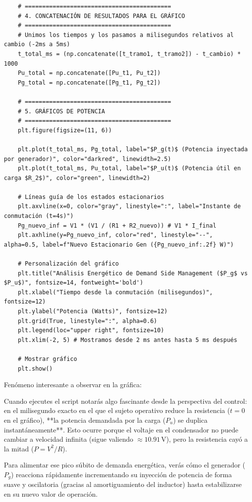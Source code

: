 \documentclass[11pt, a4paper]{article}
\theoremstyle{definition}
\theoremstyle{plain}
\theoremstyle{plain}
\theoremstyle{remark}
\theoremstyle{remark}
\theoremstyle{remark}
\begin{document}
\begin{verbatim}
	# ==========================================
	# 4. CONCATENACIÓN DE RESULTADOS PARA EL GRÁFICO
	# ==========================================
	# Unimos los tiempos y los pasamos a milisegundos relativos al cambio (-2ms a 5ms)
	t_total_ms = (np.concatenate([t_tramo1, t_tramo2]) - t_cambio) * 1000
	Pu_total = np.concatenate([Pu_t1, Pu_t2])
	Pg_total = np.concatenate([Pg_t1, Pg_t2])
	
	# ==========================================
	# 5. GRÁFICOS DE POTENCIA
	# ==========================================
	plt.figure(figsize=(11, 6))
	
	plt.plot(t_total_ms, Pg_total, label="$P_g(t)$ (Potencia inyectada por generador)", color="darkred", linewidth=2.5)
	plt.plot(t_total_ms, Pu_total, label="$P_u(t)$ (Potencia útil en carga $R_2$)", color="green", linewidth=2)
	
	# Líneas guía de los estados estacionarios
	plt.axvline(x=0, color="gray", linestyle=":", label="Instante de conmutación (t=4s)")
	Pg_nuevo_inf = V1 * (V1 / (R1 + R2_nuevo)) # V1 * I_final
	plt.axhline(y=Pg_nuevo_inf, color="red", linestyle="--", alpha=0.5, label=f"Nuevo Estacionario Gen ({Pg_nuevo_inf:.2f} W)")
	
	# Personalización del gráfico
	plt.title("Análisis Energético de Demand Side Management ($P_g$ vs $P_u$)", fontsize=14, fontweight='bold')
	plt.xlabel("Tiempo desde la conmutación (milisegundos)", fontsize=12)
	plt.ylabel("Potencia (Watts)", fontsize=12)
	plt.grid(True, linestyle=":", alpha=0.6)
	plt.legend(loc="upper right", fontsize=10)
	plt.xlim(-2, 5) # Mostramos desde 2 ms antes hasta 5 ms después
	
	# Mostrar gráfico
	plt.show()
\end{verbatim}

Fenómeno interesante a observar en la gráfica:

Cuando ejecutes el script notarás algo fascinante desde la perspectiva del control: en el milisegundo exacto en el que el sujeto operativo reduce la resistencia ($t=0$ en el gráfico), **la potencia demandada por la carga ($P_u$) se duplica instantáneamente**. Esto ocurre porque el voltaje en el condensador no puede cambiar a velocidad infinita (sigue valiendo $\approx 10.91\,\text{V}$), pero la resistencia cayó a la mitad ($P = V^2/R$).

Para alimentar ese pico súbito de demanda energética, verás cómo el generador ($P_g$) reacciona rápidamente incrementando su inyección de potencia de forma suave y oscilatoria (gracias al amortiguamiento del inductor) hasta estabilizarse en su nuevo valor de operación.
\end{document}
